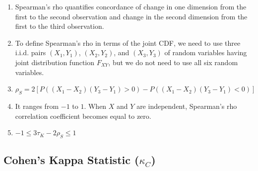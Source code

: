 \begin{enumerate}
    \item Spearman’s rho quantifies concordance of change in one dimension from the first to the second observation and change in the second dimension from the first to the third observation. 
    \hfill \cite{statistics/book/Statistics-for-Data-Scientists/Maurits-Kaptein}

    \item To define Spearman’s rho in terms of the joint CDF, we need to use three i.i.d. pairs $(X_1, Y_1)$, $(X_2, Y_2)$, and $(X_3, Y_3)$ of random variables having joint distribution function $F _{X Y} $, but we do not need to use all six random variables. 
    \hfill \cite{statistics/book/Statistics-for-Data-Scientists/Maurits-Kaptein}

    \item 
    $
        \rho_S = 2 [P((X_1 - X_2)(Y_3 - Y_1) > 0) - P((X_1 - X_2)(Y_3 - Y_1) < 0)]
    $
    \hfill \cite{statistics/book/Statistics-for-Data-Scientists/Maurits-Kaptein}

    \item It ranges from $-1$ to $1$.
    When $X$ and $Y$ are independent, Spearman’s rho correlation coefficient becomes equal to zero. 
    \hfill \cite{statistics/book/Statistics-for-Data-Scientists/Maurits-Kaptein}

    \item $-1 \leq 3\tau_K - 2\rho_S \leq 1$
    \hfill \cite{statistics/book/Statistics-for-Data-Scientists/Maurits-Kaptein}

    
\end{enumerate}





\subsection{Cohen’s Kappa Statistic ($\kappa_C$)}


